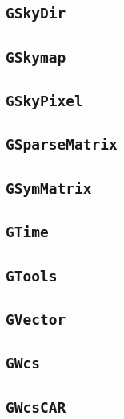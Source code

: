 \documentclass{article}[12pt,a4]
\begin{document}
\subsection{{\tt GSkyDir}}

\subsection{{\tt GSkymap}}

\subsection{{\tt GSkyPixel}}

\subsection{{\tt GSparseMatrix}}

\subsection{{\tt GSymMatrix}}

\subsection{{\tt GTime}}

\subsection{{\tt GTools}}

\subsection{{\tt GVector}}

\subsection{{\tt GWcs}}

\subsection{{\tt GWcsCAR}}
\end{document}
